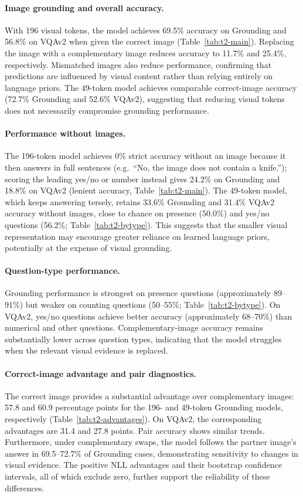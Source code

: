 \documentclass{article}
\begin{document}
\paragraph{Image grounding and overall accuracy.}
With 196 visual tokens, the model achieves 69.5\% accuracy on Grounding and 56.8\% on VQAv2 when given the correct image (Table~\ref{tab:t2-main}). Replacing the image with a complementary image reduces accuracy to 11.7\% and 25.4\%, respectively. Mismatched images also reduce performance, confirming that predictions are influenced by visual content rather than relying entirely on language priors. The 49-token model achieves comparable correct-image accuracy (72.7\% Grounding and 52.6\% VQAv2), suggesting that reducing visual tokens does not necessarily compromise grounding performance.

\paragraph{Performance without images.}
The 196-token model achieves 0\% strict accuracy without an image because it then answers in full sentences (e.g.\ ``No, the image does not contain a knife.''); scoring the leading yes/no or number instead gives 24.2\% on Grounding and 18.8\% on VQAv2 (lenient accuracy, Table~\ref{tab:t2-main}). The 49-token model, which keeps answering tersely, retains 33.6\% Grounding and 31.4\% VQAv2 accuracy without images, close to chance on presence (50.0\%) and yes/no questions (56.2\%; Table~\ref{tab:t2-bytype}). This suggests that the smaller visual representation may encourage greater reliance on learned language priors, potentially at the expense of visual grounding.

\paragraph{Question-type performance.}
Grounding performance is strongest on presence questions (approximately 89--91\%) but weaker on counting questions (50--55\%; Table~\ref{tab:t2-bytype}). On VQAv2, yes/no questions achieve better accuracy (approximately 68--70\%) than numerical and other questions. Complementary-image accuracy remains substantially lower across question types, indicating that the model struggles when the relevant visual evidence is replaced.

\paragraph{Correct-image advantage and pair diagnostics.}
The correct image provides a substantial advantage over complementary images: 57.8 and 60.9 percentage points for the 196- and 49-token Grounding models, respectively (Table~\ref{tab:t2-advantages}). On VQAv2, the corresponding advantages are 31.4 and 27.8 points. Pair accuracy shows similar trends. Furthermore, under complementary swaps, the model follows the partner image's answer in 69.5--72.7\% of Grounding cases, demonstrating sensitivity to changes in visual evidence. The positive NLL advantages and their bootstrap confidence intervals, all of which exclude zero, further support the reliability of these differences.
\end{document}
